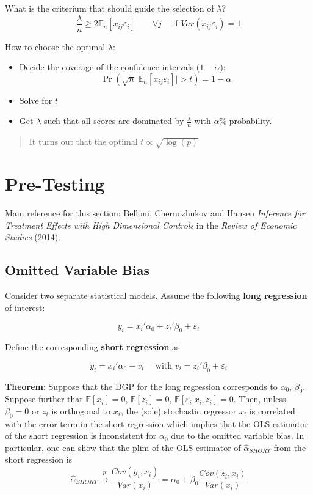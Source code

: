 \documentclass[12pt,]{book}
\providecommand{\tightlist}{%
  \setlength{\itemsep}{0pt}\setlength{\parskip}{0pt}}
\begin{document}
What is the criterium that should guide the selection of \(\lambda\)?
\[
  \frac{\lambda}{n} \geq 2 \mathbb E_n[x_{ij} \varepsilon_i] \qquad \forall j \quad \text{ if } Var(x_{ij} \varepsilon_i) = 1
\]

How to choose the optimal \(\lambda\):

\begin{itemize}
\tightlist
\item
  Decide the coverage of the confidence intervals (\(1-\alpha\)):
  \[
  \Pr \left( \sqrt{n} \Big| \mathbb E_n [x_{ij} \varepsilon_i] \Big| > t \right) = 1- \alpha
  \]
\item
  Solve for \(t\)
\item
  Get \(\lambda\) such that all scores are dominated by \(\frac{\lambda}{n}\) with \(\alpha\%\) probability.
\end{itemize}

\begin{quote}
It turns out that the optimal \(t \propto \sqrt{\log(p)}\)
\end{quote}

\hypertarget{pre-testing}{%
\section{Pre-Testing}\label{pre-testing}}

Main reference for this section: Belloni, Chernozhukov and Hansen \emph{Inference for Treatment Effects with High Dimensional Controls} in the \emph{Review of Economic Studies} (2014).

\hypertarget{omitted-variable-bias}{%
\subsection{Omitted Variable Bias}\label{omitted-variable-bias}}

Consider two separate statistical models. Assume the following \textbf{long regression} of interest:

\[
  y_i = x_i' \alpha_0+ z_i' \beta_0 + \varepsilon_i
\]

Define the corresponding \textbf{short regression} as

\[
  y_i = x_i' \alpha_0 + v_i \quad \text{ with } v_i = z_i' \beta_0 + \varepsilon_i
\]

\textbf{Theorem}:
Suppose that the DGP for the long regression corresponds to \(\alpha_0\), \(\beta_0\). Suppose further that \(\mathbb E[x_i] = 0\), \(\mathbb E[z_i] = 0\), \(\mathbb E[\varepsilon_i |x_i,z_i] = 0\). Then, unless \(\beta_0 = 0\) or \(z_i\) is orthogonal to \(x_i\), the (sole) stochastic regressor \(x_i\) is correlated with the error term in the short regression which implies that the OLS estimator of the short regression is inconsistent for \(\alpha_0\) due to the omitted variable bias. In particular, one can show that the plim of the OLS estimator of \(\hat{\alpha}_{SHORT}\) from the short regression is
\[
    \hat{\alpha}_{SHORT} \overset{p}{\to} \frac{Cov(y_i, x_i)}{Var(x_i)} = \alpha_0 + \beta_0 \frac{Cov(z_i, x_i)}{Var(x_i)}
\]
\end{document}
